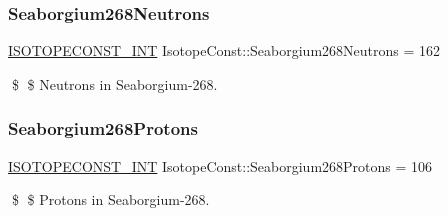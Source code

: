 \subsubsection{\texorpdfstring{Seaborgium268\+Neutrons}{Seaborgium268Neutrons}}
{\footnotesize\ttfamily \mbox{\hyperlink{group___isotope_const-_macros_ga5f18360b3e99483a35c32d789e62621c}{I\+S\+O\+T\+O\+P\+E\+C\+O\+N\+S\+T\+\_\+\+I\+NT}} Isotope\+Const\+::\+Seaborgium268\+Neutrons = 162}

\$ \$ Neutrons in Seaborgium-\/268. \mbox{\label{group___isotope_const-_seaborgium-_sg268_gae9058dc4a6b4c1bcb13e1372130c0c8f}} 
\subsubsection{\texorpdfstring{Seaborgium268\+Protons}{Seaborgium268Protons}}
{\footnotesize\ttfamily \mbox{\hyperlink{group___isotope_const-_macros_ga5f18360b3e99483a35c32d789e62621c}{I\+S\+O\+T\+O\+P\+E\+C\+O\+N\+S\+T\+\_\+\+I\+NT}} Isotope\+Const\+::\+Seaborgium268\+Protons = 106}

\$ \$ Protons in Seaborgium-\/268. 